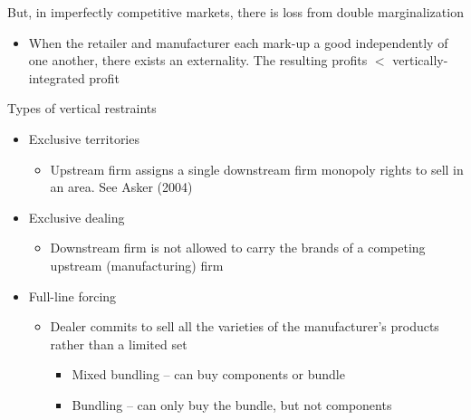\documentclass[notes=show]{beamer}
\begin{document}
\begin{frame}
But, in imperfectly competitive markets, there is loss from double
marginalization

\begin{itemize}
\item When the retailer and manufacturer each mark-up a good independently
of one another, there exists an externality. The resulting profits $<$
vertically-integrated profit
\end{itemize}
\end{frame}


\begin{frame}
Types of vertical restraints

\begin{itemize}
\item Exclusive territories

\begin{itemize}
\item Upstream firm assigns a single downstream firm monopoly rights to sell
in an area. See Asker (2004)
\end{itemize}

\item Exclusive dealing

\begin{itemize}
\item Downstream firm is not allowed to carry the brands of a competing
upstream (manufacturing) firm
\end{itemize}

\item Full-line forcing

\begin{itemize}
\item Dealer commits to sell all the varieties of the manufacturer's
products rather than a limited set

\begin{itemize}
\item Mixed bundling -- can buy components or bundle

\item Bundling -- can only buy the bundle, but not components
\end{itemize}
\end{itemize}
\end{itemize}
\end{frame}

\end{document}
